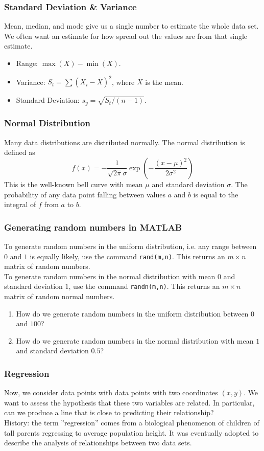 \documentclass[12pt]{beamer}
\theoremstyle{definition}
\begin{document}
\begin{frame}
\frametitle{Standard Deviation \& Variance}
Mean, median, and mode give us a single number to 
estimate the whole data set. We often want 
an estimate for how spread out the values are
from that single estimate.

\begin{itemize}
\item Range: $\max(X) - \min(X)$.
\item Variance: $S_t = \sum (X_i - \bar{X})^2$, where $\bar{X}$ is the mean.
\item Standard Deviation: $s_y = \sqrt{S_t/(n-1)}$.
\end{itemize}
\end{frame}

\begin{frame}
\frametitle{Normal Distribution}
Many data distributions are distributed normally.
The normal distribution is defined as
\[ 
f(x) = -\frac{1}{\sqrt{2\pi} \sigma} \exp\left(-\dfrac{(x-\mu)^2}{2\sigma^2}\right)
\]
This is the well-known bell curve with mean $\mu$ and standard
deviation $\sigma$. The probability of any data point falling between
values $a$ and $b$ is equal to the integral of $f$ from $a$ to $b$.
\end{frame}

\begin{frame}
\frametitle{Generating random numbers in MATLAB}
To generate random numbers in the uniform distribution, i.e.
any range between $0$ and $1$ is equally likely, use the command
{\tt rand(m,n)}. This returns an $m \times n$ matrix of random
numbers. \\[3mm]

To generate random numbers in the normal distribution with
mean $0$ and standard deviation $1$, use the command
{\tt randn(m,n)}. This returns an $m \times n$ matrix of random
normal numbers. \\[3mm]

\begin{enumerate}
\item How do we generate random numbers in the uniform
distribution between $0$ and $100$?
\item How do we generate random numbers in the normal distribution
with mean $1$ and standard deviation $0.5$?
\end{enumerate}
\end{frame}

\begin{frame}
\frametitle{Regression}
Now, we consider data points with data points with
two coordinates $(x,y)$. We want to assess the hypothesis
that these two variables are related. In particular, can
we produce a line that is close to predicting their relationship? \\[4mm]

History: the term ''regression'' comes from a biological
phenomenon of children of tall parents regressing to 
average population height. It was eventually adopted to describe the
analysis of relationships between two data sets.
\end{frame}
\end{document}
